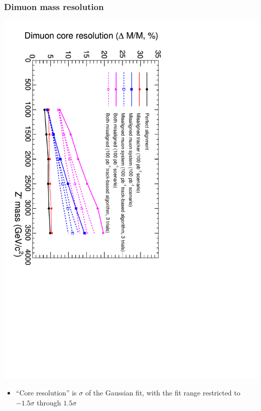 \documentclass[compress]{beamer}
\begin{document}
\begin{frame}
\frametitle{Dimuon mass resolution}

\includegraphics[height=\linewidth, angle=90]{ZSSM_Align_MassRes_color-100.pdf}

\begin{itemize}
\item ``Core resolution'' is $\sigma$ of the Gaussian fit, with the fit range restricted to $-1.5\sigma$ through $1.5\sigma$
\end{itemize}
\end{frame}
\end{document}

